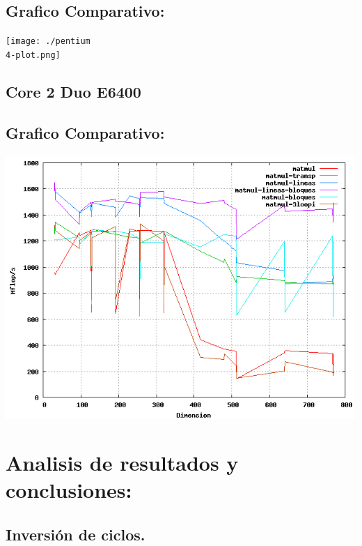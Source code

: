 \documentclass[a4paper,10pt]{article}
\begin{document}
\subsection{Grafico Comparativo: }
\texttt{[image: ./pentium\\ 4-plot.png]}
\clearpage

\subsection{Core 2 Duo E6400}


\clearpage

\clearpage

\clearpage

\clearpage

\clearpage

\clearpage

\subsection{Grafico Comparativo: }

\includegraphics[width=15cm, bb=0 0 640 480]{core2-plot.png}
\clearpage

\section{Analisis de resultados y conclusiones: }

\subsection{Inversión de ciclos.}
\end{document}
